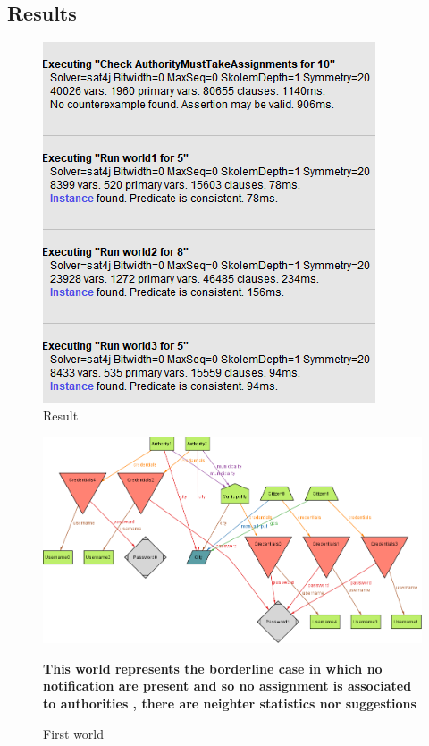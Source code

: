 \subsection{Results}
\begin{figure}[h]
\centering
\includegraphics[width=\textwidth]{Images/alexecutionstatus.png}
\caption{Result}
\end{figure}
\begin{figure}[h]
\centering
\includegraphics[width=\textwidth]{Images/alworld1.png}
\caption{First world}
\textbf{This world represents the borderline case in which no notification are present and so no assignment is associated to authorities , there are neighter statistics nor suggestions}
\end{figure}
